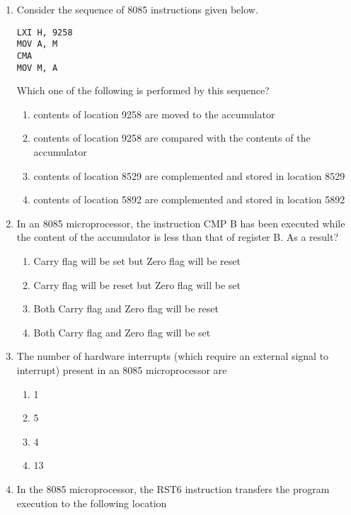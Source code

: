 \documentclass[journal,12pt,twocolumn]{IEEEtran}
\begin{document}
\begin{enumerate}
\item Consider the sequence of 8085 instructions given below.
\begin{verbatim}
LXI H, 9258
MOV A, M
CMA
MOV M, A
\end{verbatim}
Which one of the following is performed by this sequence?  

    \begin{enumerate}
     \item contents of location 9258 are moved to the accumulator 
     \item contents of location 9258 are compared with the contents of the accumulator
     \item contents of location 8529 are complemented and stored in location 8529
     \item contents of location 5892 are complemented and stored in location 5892
    \end{enumerate}
   
    
    \item In an 8085 microprocessor, the instruction CMP B has been executed while the
content of the accumulator is less than that of register B. As a result?
                       
   \begin{enumerate}
     \item Carry flag will be set but Zero flag will be reset 
      \item Carry flag will be reset but Zero flag will be set
      \item Both Carry flag and Zero flag will be reset
      \item Both Carry flag and Zero flag will be set
    \end{enumerate} 
    
     \item The number of hardware interrupts (which require an external signal to interrupt)
present in an 8085 microprocessor are
    \begin{enumerate}
      \item 1
      \item 5
      \item 4
      \item 13
    \end{enumerate}
     \item In the 8085 microprocessor, the RST6 instruction transfers the program
execution to the following location
                         

\end{enumerate}
\end{document}

